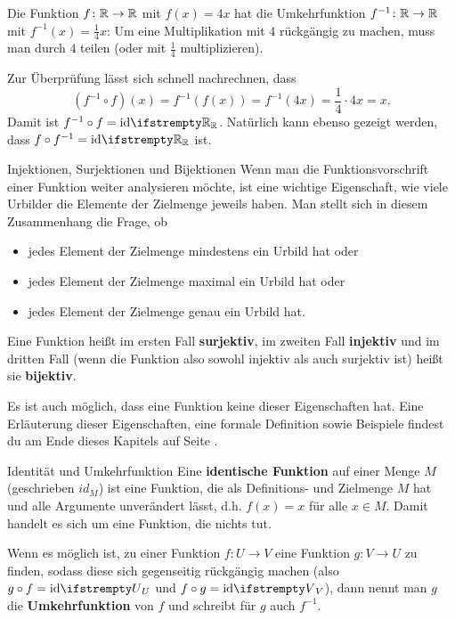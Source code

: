 \documentclass[../../main.tex]{subfiles}
\begin{document}
\begin{example}{}
    Die Funktion $f\colon\mathbb{R}\rightarrow\mathbb{R}$ mit $f(x)=4x$ hat die Umkehrfunktion $f^{-1}\colon\mathbb{R}\rightarrow\mathbb{R}$ mit $f^{-1}(x)=\frac{1}{4}x$: Um eine Multiplikation mit $4$ rückgängig zu machen, muss man durch $4$ teilen (oder mit $\frac{1}{4}$ multiplizieren).
    
    Zur Überprüfung lässt sich schnell nachrechnen, dass \[(f^{-1}\circ f)(x)=f^{-1}(f(x))=f^{-1}(4x)=\frac{1}{4}\cdot 4x=x.\] 
    Damit ist $f^{-1}\circ f=\ident[\Real]$. Natürlich kann ebenso gezeigt werden, dass $f\circ f^{-1}=\ident[\Real]$ ist.
\end{example}

\begin{advanced}{Injektionen, Surjektionen und Bijektionen}
    Wenn man die Funktionsvorschrift einer Funktion weiter analysieren möchte, ist eine wichtige Eigenschaft, wie viele Urbilder die Elemente der Zielmenge jeweils haben. Man stellt sich in diesem Zusammenhang die Frage, ob
    \begin{itemize}[noitemsep]
        \item jedes Element der Zielmenge mindestens ein Urbild hat oder
        \item jedes Element der Zielmenge maximal ein Urbild hat oder
        \item jedes Element der Zielmenge genau ein Urbild hat.
    \end{itemize}
    
    Eine Funktion heißt im ersten Fall \textbf{surjektiv}, im zweiten Fall \textbf{injektiv} und im dritten Fall (wenn die Funktion also sowohl injektiv als auch surjektiv ist) heißt sie \textbf{bijektiv}.
    
    Es ist auch möglich, dass eine Funktion keine dieser Eigenschaften hat.
    Eine Erläuterung dieser Eigenschaften, eine formale Definition sowie Beispiele findest du am Ende dieses Kapitels auf Seite \pageref{advanced:bijektion}.
\end{advanced}

\begin{nutshell}{Identität und Umkehrfunktion}
    \sloppy
    Eine \textbf{identische Funktion} auf einer Menge $M$ (geschrieben $id_M$) ist eine Funktion, die als Definitions- und Zielmenge $M$ hat und alle Argumente unverändert lässt, d.h. $f(x)=x$ für alle $x\in M$. Damit handelt es sich um eine Funktion, die nichts tut.
    
    Wenn es möglich ist, zu einer Funktion $f\colon U\rightarrow V$ eine Funktion $g\colon V\rightarrow U$ zu finden, sodass diese sich gegenseitig rückgängig machen (also $g\circ f=\ident[U]$ und $f\circ g=\ident[V]$), dann nennt man $g$ die \textbf{Umkehrfunktion} von $f$ und schreibt für $g$ auch $f^{-1}$.
\end{nutshell}
\fussy
\end{document}
